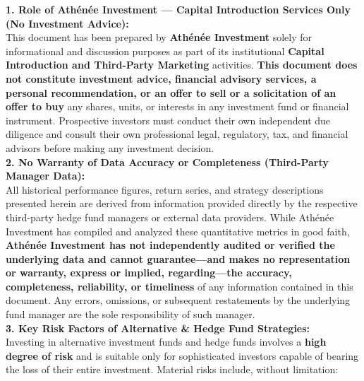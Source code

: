 \documentclass[10pt,a4paper]{article}
\begin{document}
\begin{tcolorbox}[colback=white, colframe=accent, title=\textbf{\small\strut Important Legal Disclaimer, Risk Disclosures \& Capital Introduction Notice}, fonttitle=\sffamily\bfseries\small, arc=5pt, boxrule=0.9pt, toptitle=5pt, bottomtitle=5pt, left=8pt, right=8pt, top=5pt, bottom=5pt, colbacktitle=accent]
\scriptsize
\textcolor{primary}{
\textbf{1. Role of Ath\'en\'ee Investment — Capital Introduction Services Only (No Investment Advice):}\\[1.5pt]
This document has been prepared by \textbf{Ath\'en\'ee Investment} solely for informational and discussion purposes as part of its institutional \textbf{Capital Introduction and Third-Party Marketing} activities. \textbf{This document does not constitute investment advice, financial advisory services, a personal recommendation, or an offer to sell or a solicitation of an offer to buy} any shares, units, or interests in any investment fund or financial instrument. Prospective investors must conduct their own independent due diligence and consult their own professional legal, regulatory, tax, and financial advisors before making any investment decision.\\[5pt]
\textbf{2. No Warranty of Data Accuracy or Completeness (Third-Party Manager Data):}\\[1.5pt]
All historical performance figures, return series, and strategy descriptions presented herein are derived from information provided directly by the respective third-party hedge fund managers or external data providers. While Ath\'en\'ee Investment has compiled and analyzed these quantitative metrics in good faith, \textbf{Ath\'en\'ee Investment has not independently audited or verified the underlying data and cannot guarantee—and makes no representation or warranty, express or implied, regarding—the accuracy, completeness, reliability, or timeliness} of any information contained in this document. Any errors, omissions, or subsequent restatements by the underlying fund manager are the sole responsibility of such manager.\\[5pt]
\textbf{3. Key Risk Factors of Alternative \& Hedge Fund Strategies:}\\[1.5pt]
Investing in alternative investment funds and hedge funds involves a \textbf{high degree of risk} and is suitable only for sophisticated investors capable of bearing the loss of their entire investment. Material risks include, without limitation:
\begin{itemize}[leftmargin=1.3em, itemsep=1pt, topsep=1pt]

\end{itemize}}
\end{tcolorbox}
\end{document}
